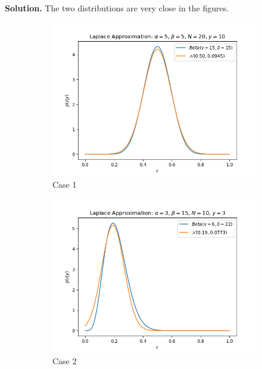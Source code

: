 \documentclass[10pt]{article}
\begin{document}
\begin{itemize}
{\bf Solution.}
The two distributions are very close in the figures.
\begin{figure}[h!]
\centering
\begin{subfigure}[]{.32\textwidth}
  \centering
  \includegraphics[width=1\linewidth]{figures/laplace_case1.png}
  \caption{Case 1}
  \label{fig:sub1}
\end{subfigure}
\begin{subfigure}{.32\textwidth}
  \centering
  \includegraphics[width=1\linewidth]{figures/laplace_case2.png}
  \caption{Case 2}
  \label{fig:sub2}
\end{subfigure}
\begin{subfigure}{.32\textwidth}
  \centering

\end{subfigure}
\end{figure}
\end{itemize}
\end{document}
